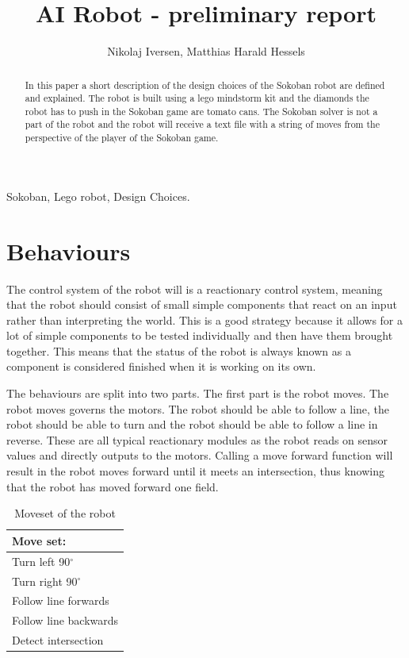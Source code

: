 \documentclass[journal,10pt]{IEEEtran} %
\title{AI Robot - preliminary report}
\author{Nikolaj Iversen, Matthias Harald Hessels}
\begin{document}
\maketitle

\begin{abstract}
In this paper a short description of the design choices of the Sokoban robot are defined and explained.
The robot is built using a lego mindstorm kit and the diamonds the robot has to push in the Sokoban game are tomato cans.
The Sokoban solver is not a part of the robot and the robot will receive a text file with a string of moves from the perspective of the player of the Sokoban game.
\end{abstract}

\begin{IEEEkeywords}
Sokoban, Lego robot, Design Choices.
\end{IEEEkeywords}


\section{Behaviours}
The control system of the robot will is a reactionary control system, meaning that the robot should consist of small  simple components that react on an input rather than interpreting the world.
This is a good strategy because it allows for a lot of simple components to be tested individually and then have them brought together.
This means that the status of the robot is always known as a component is considered finished when it is working on its own.

The behaviours are split into two parts.
The first part is the robot moves. 
The robot moves governs the motors. 
The robot should be able to follow a line, the robot should be able to turn and the robot should be able to follow a line in reverse.
These are all typical reactionary modules as the robot reads on sensor values and directly outputs to the motors.
Calling a move forward function will result in the robot moves forward until it meets an intersection, thus knowing that the robot has moved forward one field.

\begin{table}[h!]
\centering
 \begin{tabular}{|l|}
  \hline
  Move set: \\
  \hline
   Turn left 90$^{\circ}$ \\
   Turn right 90$^{\circ}$\\
   Follow line forwards\\
   Follow line backwards\\
   Detect intersection \\
   \hline
 \end{tabular}
\caption{Moveset of the robot}
\label{tab:movset}
\end{table}
\end{document}
